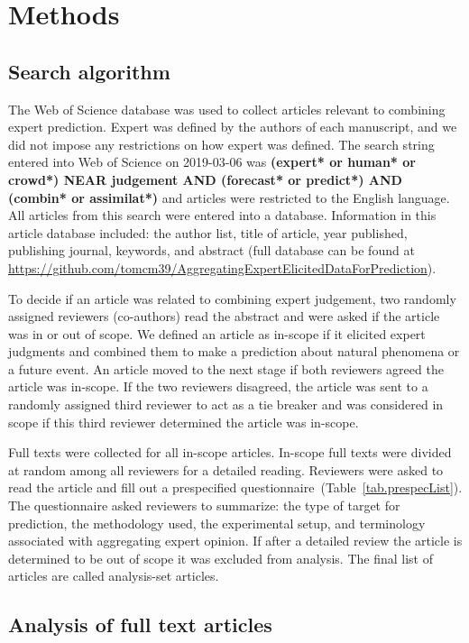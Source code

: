 \documentclass[preprint,authoryear]{elsarticle}
\begin{document}
\section{Methods}
\label{sec.methods}

\subsection{Search algorithm}

The Web of Science database was used to collect articles relevant to combining expert prediction.
Expert was defined by the authors of each manuscript, and we did not impose any restrictions on how expert was defined.
The search string entered into Web of Science on 2019-03-06 was \textbf{(expert* or human* or crowd*) NEAR judgement AND (forecast* or predict*) AND (combin* or assimilat*)} and articles were restricted to the English language.
All articles from this search were entered into a database.
Information in this article database included: the author list, title of article, year published, publishing journal, keywords, and abstract (full database can be found at \url{https://github.com/tomcm39/AggregatingExpertElicitedDataForPrediction}).

To decide if an article was related to combining expert judgement, two randomly assigned reviewers (co-authors) read the abstract and were asked if the article was in or out of scope.
We defined an article as in-scope if it elicited expert judgments and combined them to make a prediction about natural phenomena or a  future event.
An article moved to the next stage if both reviewers agreed the article was in-scope.
If the two reviewers disagreed, the article was sent to a randomly assigned third reviewer to act as a tie breaker and was considered in scope if this third reviewer determined the article was in-scope.

Full texts were collected for all in-scope articles.
In-scope full texts were divided at random among all reviewers for a detailed reading.
Reviewers were asked to read the article and fill out a prespecified questionnaire~(Table~\ref{tab.prespecList}).
The questionnaire asked reviewers to summarize: the type of target for prediction, the methodology used, the experimental setup, and terminology associated with aggregating expert opinion.
If after a detailed review the article is determined to be out of scope it was excluded from analysis.
The final list of articles are called analysis-set articles.

\subsection{Analysis of full text articles}
\end{document}
